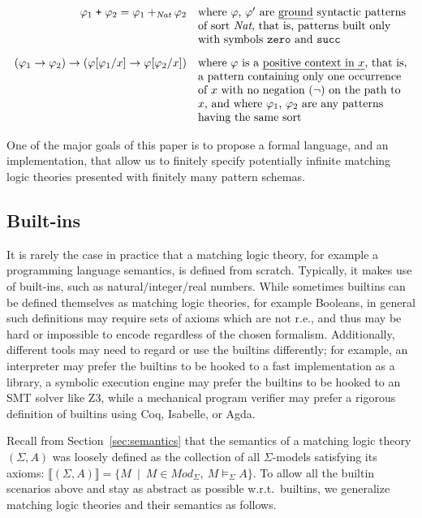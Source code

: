\documentclass[UTF8,11pt]{article}
\theoremstyle{plain}
\theoremstyle{definition}
\theoremstyle{remark}
\newcommand{\Nat}{\textit{Nat}}
\newcommand{\Mod}{\textit{Mod}}
\newcommand{\denote}[1]{\llbracket{#1}\rrbracket}
\begin{document}
$$\begin{array}{rl}
\varphi_1 \mathrel{\texttt{+}} \varphi_2 = \varphi_1 +_\Nat \varphi_2
& \textrm{where $\varphi$, $\varphi'$ are \emph{ground} syntactic patterns}
\\
&\textrm{of sort $\Nat$, that is, patterns built only}
\\
&\textrm{with symbols \texttt{zero} and \texttt{succ}}
\\[2ex]
(\varphi_1 \rightarrow \varphi_2) \rightarrow
(\varphi[\varphi_1 / x] \rightarrow \varphi[\varphi_2 / x])
& \textrm{where $\varphi$ is a \emph{positive context in $x$}, that is,}
\\
& \textrm{a pattern
containing only one occurrence}
\\
&\textrm{of $x$ with no negation ($\neg$) on the path to}
\\
&\textrm{$x$, and where $\varphi_1$, $\varphi_2$ are any patterns}
\\
&\textrm{having the same sort}
\end{array}
$$

One of the major goals of this paper is to propose a formal language,
and an implementation, that allow us to finitely specify potentially
infinite matching logic theories presented with finitely many pattern schemas.

\subsection{Built-ins}
\label{sec:builtins}

It is rarely the case in practice that a matching logic theory, for example
a programming language semantics, is defined from scratch.
Typically, it makes use of built-ins, such as natural/integer/real numbers.
While sometimes builtins can be defined themselves as matching logic theories,
for example Booleans, in general such definitions may require sets of axioms
which are not r.e., and thus may be hard or impossible to encode regardless
of the chosen formalism.
Additionally, different tools may need to regard or use the builtins
differently;
for example, an interpreter may prefer the builtins to be hooked to a
fast implementation as a library, a symbolic execution engine may prefer the
builtins to be hooked to an SMT solver like Z3, while a mechanical program
verifier may prefer a rigorous definition of builtins using Coq, Isabelle,
or Agda.

Recall from Section~\ref{sec:semantics} that the semantics of a matching
logic theory $(\Sigma,A)$ was loosely defined as the collection of all
$\Sigma$-models satisfying its axioms: $\denote{(\Sigma,A)} =
\{M \ \mid \ M \in \Mod_{\Sigma},\ M \models_{\Sigma} A \}$.
To allow all the builtin scenarios above and stay as abstract as possible
w.r.t.~builtins, we generalize matching logic theories and their semantics
as follows.
\end{document}
